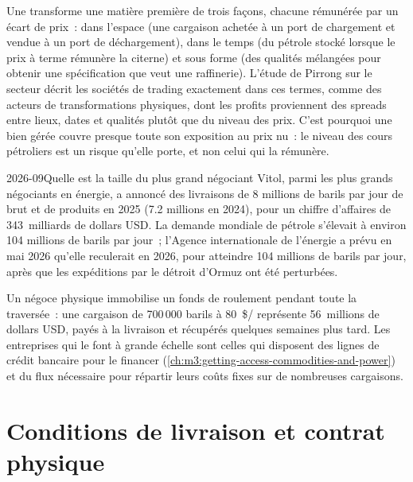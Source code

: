 Une  transforme une matière première de trois façons, chacune rémunérée
par un écart de prix~: dans l'espace (une cargaison achetée à un port de chargement et vendue à un
port de déchargement), dans le temps (du pétrole stocké lorsque le prix à terme rémunère la citerne)
et sous forme (des qualités mélangées pour obtenir une spécification que veut une raffinerie). L'étude de Pirrong
sur le secteur décrit les sociétés de trading exactement dans ces termes, comme
des acteurs de transformations physiques, dont les profits proviennent des spreads
entre lieux, dates et qualités plutôt que du niveau des prix.
C'est pourquoi une  bien gérée couvre presque toute son exposition au prix nu~:
le niveau des cours pétroliers est un risque qu'elle porte, et non celui qui
la rémunère.

\begin{dated}{2026-09}{Quelle est la taille du plus grand négociant}\label{dat:m3:physical-commodity-markets:scale}
Vitol, parmi les plus grands négociants en énergie, a annoncé des livraisons de 8 millions de barils par jour
de brut et de produits en 2025 (7.2 millions en 2024), pour un chiffre d'affaires de
343~milliards de dollars USD. La demande mondiale de pétrole s'élevait à environ 104 millions de barils par jour~; l'Agence internationale
de l'énergie a prévu en mai 2026 qu'elle reculerait en 2026, pour atteindre 104 millions
de barils par jour, après que les expéditions par le détroit d'Ormuz ont été perturbées.
\end{dated}

\begin{remark}\label{rem:m3:physical-commodity-markets:scale}
Un négoce physique immobilise un fonds de roulement pendant toute la traversée~: une
cargaison de 700\,000 barils à \qty{80}{\$/\barrel} représente 56~millions de dollars USD, payés à
la livraison et récupérés quelques semaines plus tard. Les entreprises qui le font à grande échelle sont celles
qui disposent des lignes de crédit bancaire pour le financer (\cref{ch:m3:getting-access-commodities-and-power})
et du flux nécessaire pour répartir leurs coûts fixes sur de nombreuses cargaisons.
\end{remark}

\section{Conditions de livraison et contrat physique}

